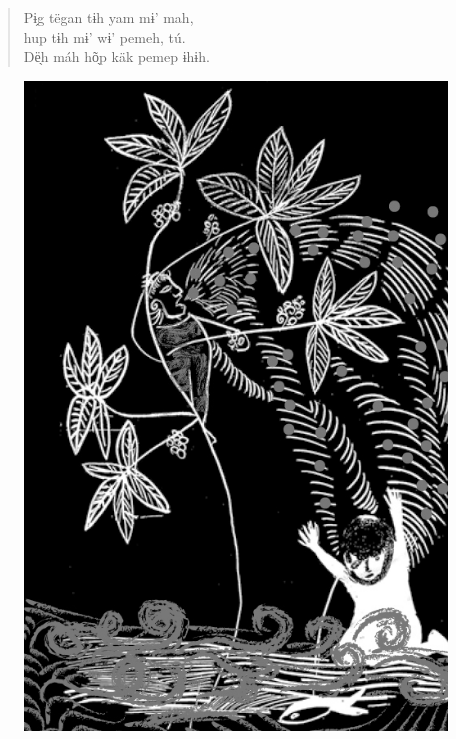 \begin{verse}
Pɨ̗g tëgan tɨh yam mɨ’ mah,\\
hup tɨh mɨ’ wɨ’ pemeh, tú.\\
Dë̖h máh hõ̖p käk pemep ɨhɨh.
\end{verse}

\vspace*{\fill}

\begin{figure}
\vspace*{-1.2cm}
\hspace*{-2.2cm}\includegraphics[width=138mm]{./imgs/img2.jpg}
\end{figure}

\chapter*{}

